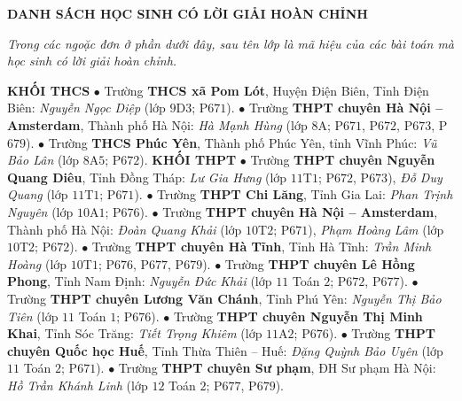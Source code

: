 \begin{center}
	\textbf{DANH SÁCH HỌC SINH CÓ LỜI GIẢI HOÀN CHỈNH}
\end{center}
\textit{Trong các ngoặc đơn ở phần dưới đây, sau tên lớp là mã hiệu của các bài toán mà học sinh có lời giải hoàn chỉnh.}
\vskip 0.05cm
\begin{multicols}{2}
	\textbf{KHỐI THCS}
	\vskip 0.05cm
	$\bullet$  Trường \textbf{THCS xã Pom Lót}, Huyện Điện Biên, Tỉnh Điện Biên: \textit{Nguyễn Ngọc Diệp} (lớp $9$D$3$; P$671$).
	\vskip 0.05cm
	$\bullet$  Trường \textbf{THPT chuyên Hà Nội -- Amsterdam}, Thành phố Hà Nội: \textit{Hà Mạnh Hùng} (lớp $8$A; P$671$, P$672$, P$673$, P$679$).
	\vskip 0.05cm
	$\bullet$  Trường \textbf{THCS Phúc Yên}, Thành phố Phúc Yên, tỉnh Vĩnh Phúc: \textit{Vũ Bảo Lân} (lớp $8$A$5$; P$672$).
	\vskip 0.05cm
	\textbf{KHỐI THPT}
	\vskip 0.05cm
	$\bullet$  Trường \textbf{THPT chuyên Nguyễn Quang Diêu}, Tỉnh Đồng Tháp: \textit{Lư Gia Hưng} (lớp $11$T$1$; P$672$, P$673$), \textit{Đỗ Duy Quang} (lớp $11$T$1$; P$671$).
	\vskip 0.05cm
	$\bullet$  Trường \textbf{THPT Chi Lăng}, Tỉnh Gia Lai: \textit{Phan Trịnh Nguyên} (lớp $10$A$1$; P$676$).
	\vskip 0.05cm
	$\bullet$  Trường \textbf{THPT chuyên Hà Nội -- Amsterdam}, Thành phố Hà Nội: \textit{Đoàn Quang Khải} (lớp $10$T$2$; P$671$), \textit{Phạm Hoàng Lâm} (lớp $10$T$2$; P$672$).
	\vskip 0.05cm
	$\bullet$  Trường \textbf{THPT chuyên Hà Tĩnh}, Tỉnh Hà Tĩnh: \textit{Trần Minh Hoàng} (lớp $10$T$1$; P$676$, P$677$, P$679$).
	\vskip 0.05cm
	$\bullet$  Trường \textbf{THPT chuyên Lê Hồng Phong}, Tỉnh Nam Định: \textit{Nguyễn Đức Khải} (lớp $11$ Toán $2$; P$672$, P$677$).
	\vskip 0.05cm
	$\bullet$  Trường \textbf{THPT chuyên Lương Văn Chánh}, Tỉnh Phú Yên: \textit{Nguyễn Thị Bảo Tiên} (lớp $11$ Toán $1$; P$676$).
	\vskip 0.05cm
	$\bullet$  Trường \textbf{THPT chuyên Nguyễn Thị Minh Khai}, Tỉnh Sóc Trăng: \textit{Tiết Trọng Khiêm} (lớp $11$A$2$; P$676$).
	\vskip 0.05cm
	$\bullet$  Trường \textbf{THPT chuyên Quốc học Huế}, Tỉnh Thừa Thiên -- Huế: \textit{Đặng Quỳnh Bảo Uyên} (lớp $11$ Toán $2$; P$671$).
	\vskip 0.05cm
	$\bullet$  Trường \textbf{THPT chuyên Sư phạm}, ĐH Sư phạm Hà Nội: \textit{Hồ Trần Khánh Linh} (lớp $12$ Toán $2$; P$677$, P$679$).
\end{multicols}